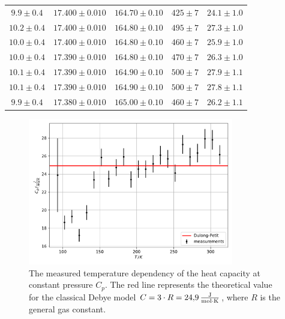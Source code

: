 \begin{table}
\begin{tabular}{c c c c c}
        $9.9\pm0.4$ & $17.400\pm0.010$ & $164.70\pm0.10$ & $425\pm7$ & $24.1\pm1.0$ \\
        $10.2\pm0.4$ & $17.400\pm0.010$ & $164.80\pm0.10$ & $495\pm7$ & $27.3\pm1.0$ \\
        $10.0\pm0.4$ & $17.400\pm0.010$ & $164.80\pm0.10$ & $460\pm7$ & $25.9\pm1.0$ \\
        $10.0\pm0.4$ & $17.390\pm0.010$ & $164.80\pm0.10$ & $470\pm7$ & $26.3\pm1.0$ \\
        $10.1\pm0.4$ & $17.390\pm0.010$ & $164.90\pm0.10$ & $500\pm7$ & $27.9\pm1.1$ \\
        $10.1\pm0.4$ & $17.390\pm0.010$ & $164.90\pm0.10$ & $500\pm7$ & $27.8\pm1.1$ \\
        $9.9\pm0.4$ & $17.380\pm0.010$ & $165.00\pm0.10$ & $460\pm7$ & $26.2\pm1.1$ \\
        \bottomrule
    \end{tabular}
\end{table}
\begin{figure}
    \centering
    \includegraphics[width=0.8\textwidth]{content/plots/C_p.pdf}
    \caption{The measured temperature dependency of the heat capacity at constant pressure $C_p$.
    The red line represents the theoretical value for the classical Debye model $C = 3 \cdot R = \qty{24.9}{\frac{\joule}{\mol \cdot \kelvin}}$, where $R$ is the general gas constant.}
    \label{fig:C_p}
\end{figure}
\FloatBarrier

